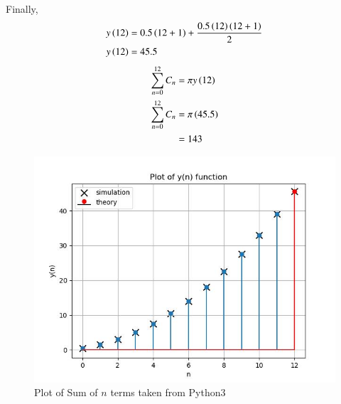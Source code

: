 \documentclass[journal,12pt,twocolumn]{IEEEtran}
\theoremstyle{remark}
\begin{document}
Finally, 
\begin{align}
    y\left(12\right) &= 0.5\left(12+1\right) + \frac{0.5\left(12\right)\left(12+1\right)}{2}\\
    y\left(12\right) &= 45.5
\end{align}
\begin{align}
    \sum_{n = 0}^{12}C_{n} &= \pi y\left(12\right)\\
    \sum_{n = 0}^{12}C_{n} &= \pi \left(45.5\right)\\
                           &= 143
\end{align}

\begin{figure}[h]
\renewcommand\thefigure{1}
    \centering
    \includegraphics[width=1.0\columnwidth]{figs/fig_1.jpg}
    \caption{Plot of Sum of $n$ terms taken from Python3}
    \label{fig_2}
\end{figure}
\end{document}
